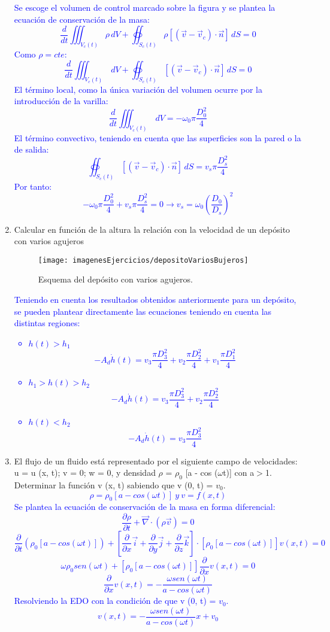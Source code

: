 \begin{enumerate}
\begin{figure}[H]
	\end{figure}
	\textcolor{blue}{
		Se escoge el volumen de control marcado sobre la figura y se plantea la ecuación de conservación de la masa:
	\[\dfrac{d}{dt}\iiint_{V_c(t)}\rho\,dV+\oiint_{S_c(t)} \rho\left[(\vec{v}-\vec{v}_c)\cdot\vec{n}\right] \,dS=0\]
	Como $\rho=cte$:
	\[\dfrac{d}{dt}\iiint_{V_c(t)}\,dV+\oiint_{S_c(t)} \left[(\vec{v}-\vec{v}_c)\cdot\vec{n}\right] \,dS=0\]
	El término local, como la única variación del volumen ocurre por la introducción de la varilla:
	\[\dfrac{d}{dt}\iiint_{V_c(t)}\,dV=-\omega _0 \pi \dfrac{D^2_0}{4}\]
	El término convectivo, teniendo en cuenta que las superficies son la pared o la de salida:
	\[\oiint_{S_c(t)} \left[(\vec{v}-\vec{v}_c)\cdot\vec{n}\right] \,dS=v_s \pi \dfrac{D^2_s}{4}\]
	Por tanto:
	\[-\omega _0 \pi \dfrac{D^2_0}{4}+v_s \pi \dfrac{D^2_s}{4}=0\rightarrow v_s=\omega _0 \left(\dfrac{D_0}{D_s}\right)^2\]
	}	
	
	\newpage
	\item Calcular en función de la altura la relación con la velocidad de un depósito con varios agujeros
	\begin{figure}[H]
		\centering
		\texttt{[image: imagenesEjercicios/depositoVariosBujeros]}
		\caption{Esquema del depósito con varios agujeros.}
		\label{fig:depositovariosbujeros}
	\end{figure}
\textcolor{blue}{
Teniendo en cuenta los resultados obtenidos anteriormente para un depósito, se pueden plantear directamente las ecuaciones teniendo en cuenta las distintas regiones:
\begin{itemize}
	\item $h(t)>h_1$
	\[-A_d\dot{h}(t)=v_3\dfrac{\pi D^2_3}{4}+v_2\dfrac{\pi D^2_2}{4}+v_1\dfrac{\pi D^2_1}{4}\]
	\item $h_1>h(t)>h_2$
	\[-A_d\dot{h}(t)=v_3\dfrac{\pi D^2_3}{4}+v_2\dfrac{\pi D^2_2}{4}\]
	\item $h(t)<h_2$
	\[-A_d\dot{h}(t)=v_3\dfrac{\pi D^2_3}{4}\]
\end{itemize}
}

	\newpage
	\item El flujo de un fluido está representado por el siguiente campo de velocidades: u = u (x, t);
	v = 0; w = 0, y densidad $\rho$ =  $\rho _0$ [a - cos ($\omega$t)] con a$>$1. Determinar la función v (x, t)
	sabiendo que v (0, t) = $v_0$.
	\textcolor{blue}{
	\[\rho =  \rho _0 [a - cos (\omega t)] \ y \ v=f(x,t)\]
	Se plantea la ecuación de conservación de la masa en forma diferencial:
	\[\dfrac{\partial \rho}{\partial t} +\vec{\nabla}\cdot\left(\rho\vec{v}\right)=0\]
	\[\dfrac{\partial}{\partial t}\left(\rho _0 [a - cos (\omega t)]\right)+\left[\dfrac{\partial}{\partial x}\vec{i}+
	\dfrac{\partial}{\partial y}\vec{j}+
	\dfrac{\partial}{\partial z}\vec{k}\right]\cdot \left[ \rho _0 [a - cos (\omega t)] \right]v(x,t)=0\]
	\[
	\omega \rho _0 sen(\omega t)+\left[ \rho _0 [a - cos (\omega t)] \right]\dfrac{\partial}{\partial x}v(x,t)=0
	\]
	\[\dfrac{\partial}{\partial x}v(x,t)=-\dfrac{\omega sen(\omega t)}{a - cos (\omega t)}\]
	Resolviendo la EDO con la condición de que v (0, t) = $v_0$.
	\[v(x,t)=-\dfrac{\omega sen(\omega t)}{a - cos (\omega t)}x+v_0\]
	}
\end{enumerate}
\newpage


